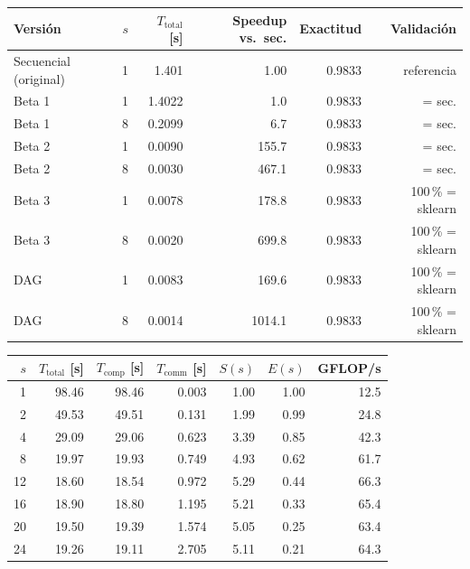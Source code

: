 \begin{tabular}{lrrrrr}
\toprule
Versión & $s$ & $T_{\text{total}}$ [s] & Speedup vs.\ sec. & Exactitud & Validación \\
\midrule
Secuencial (original) & 1 & 1.401 & 1.00 & 0.9833 & referencia \\
Beta 1 & 1 & 1.4022 & 1.0 & 0.9833 & = sec. \\
Beta 1 & 8 & 0.2099 & 6.7 & 0.9833 & = sec. \\
Beta 2 & 1 & 0.0090 & 155.7 & 0.9833 & = sec. \\
Beta 2 & 8 & 0.0030 & 467.1 & 0.9833 & = sec. \\
Beta 3 & 1 & 0.0078 & 178.8 & 0.9833 & 100\,\% = sklearn \\
Beta 3 & 8 & 0.0020 & 699.8 & 0.9833 & 100\,\% = sklearn \\
DAG & 1 & 0.0083 & 169.6 & 0.9833 & 100\,\% = sklearn \\
DAG & 8 & 0.0014 & 1014.1 & 0.9833 & 100\,\% = sklearn \\
\bottomrule
\end{tabular}

\begin{tabular}{rrrrrrr}
\toprule
$s$ & $T_{\text{total}}$ [s] & $T_{\text{comp}}$ [s] & $T_{\text{comm}}$ [s] & $S(s)$ & $E(s)$ & GFLOP/s \\
\midrule
1 & 98.46 & 98.46 & 0.003 & 1.00 & 1.00 & 12.5 \\
2 & 49.53 & 49.51 & 0.131 & 1.99 & 0.99 & 24.8 \\
4 & 29.09 & 29.06 & 0.623 & 3.39 & 0.85 & 42.3 \\
8 & 19.97 & 19.93 & 0.749 & 4.93 & 0.62 & 61.7 \\
12 & 18.60 & 18.54 & 0.972 & 5.29 & 0.44 & 66.3 \\
16 & 18.90 & 18.80 & 1.195 & 5.21 & 0.33 & 65.4 \\
20 & 19.50 & 19.39 & 1.574 & 5.05 & 0.25 & 63.4 \\
24 & 19.26 & 19.11 & 2.705 & 5.11 & 0.21 & 64.3 \\
\bottomrule
\end{tabular}

